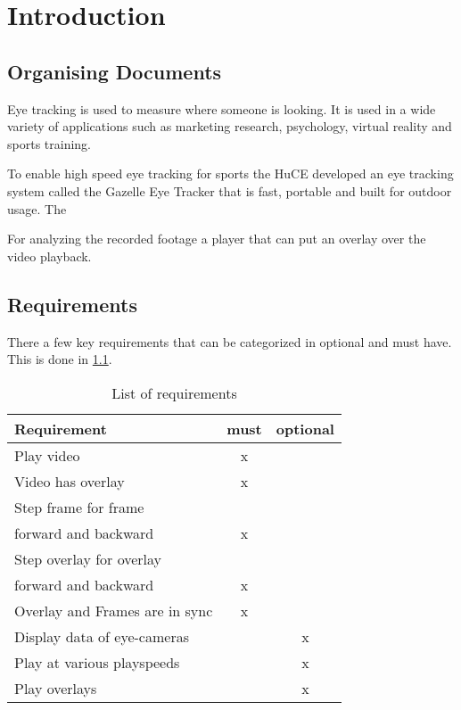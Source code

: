 \chapter{Introduction}
\label{chap:introduction}



\nocite{kopka:band1}
\nocite{raichle:bibtex_programmierung}
\nocite{MiKTeX}
\nocite{KOMA}
\nocite{TeXnicCenter}
\nocite{Marti06}
\nocite{Erbsland08}
\nocite{juergens:einfuehrung}
\nocite{juergens:fortgeschritten}

\section{Organising Documents}
\label{sec:einleitung_aufbau}
Eye tracking is used to measure where someone is looking. It is used in a wide variety of applications such as marketing research, psychology, virtual reality and sports training. 

To enable high speed eye tracking for sports the HuCE developed an eye tracking system called the Gazelle Eye Tracker that is fast, portable and built for outdoor usage. The  

For analyzing the recorded footage a player that can put an overlay over the video playback.



\section{Requirements}
\label{sec:introduction_contact}

There a few key requirements that can be categorized in optional and must have. This is done in \ref{tab:requirements}. 

\begin{table}[H]
	\centering
	\begin{tabular}{lcc} \toprule
		\textbf{Requirement} & \textbf{must} & \textbf{optional} \\ \midrule
		Play video & x &  \\ \midrule
		Video has overlay & x &  \\ \midrule
		Step frame for frame \\ forward and backward& x &  \\ \midrule
		Step overlay for overlay \\ forward and backward& x &  \\ \midrule
		Overlay and Frames are in sync & x &  \\ \midrule
		Display data of eye-cameras &  & x \\ \midrule
		Play at various playspeeds &  & x \\ \midrule
		Play overlays &  & x \\ \midrule
	\end{tabular}
	\caption{List of requirements }
	\label{tab:requirements}
\end{table}

